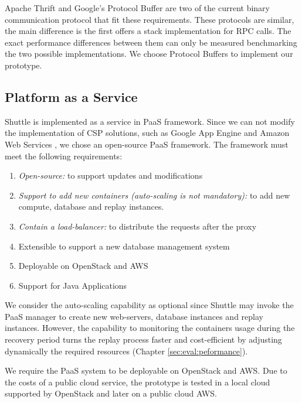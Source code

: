 Apache Thrift \cite{Thrift} and Google's Protocol Buffer \cite{protobuffers} are two of the current binary communication protocol that fit these requirements. These protocols are similar, the main difference is the first offers a stack implementation for \acf{RPC} calls. The exact performance differences between them can only be measured benchmarking the two possible implementations. We choose Protocol Buffers to implement our prototype.



\subsection{Platform as a Service}\label{sec:impl:paas}
Shuttle is implemented as a service in \ac{PaaS} framework. Since we can not modify the implementation of \acf{CSP} solutions, such as Google App Engine \cite{GoogleAppEngine} and Amazon Web Services \cite{AmazonElasticBeanstalk}, we chose an open-source \ac{PaaS} framework. The framework must meet the following requirements: 

\begin{enumerate}
	\item \textit{Open-source:} to support updates and modifications
	\item \textit{Support to add new containers (auto-scaling is not mandatory):} to add new compute, database and replay instances.
	\item \textit{Contain a load-balancer:} to distribute the requests after the proxy
	\item  Extensible to support a new database management system
	\item Deployable on OpenStack and \acf{AWS}
	\item Support for Java Applications
\end{enumerate}

We consider the auto-scaling capability as optional since Shuttle may invoke the \ac{PaaS} manager to create new web-servers, database instances and replay instances. However, the capability to monitoring the containers usage during the recovery period turns the replay process faster and cost-efficient by adjusting dynamically the required resources (Chapter \ref{sec:eval:peformance}). 

We require the \ac{PaaS} system to be deployable on OpenStack \cite{openstack} and \acf{AWS}. Due to the costs of a public cloud service, the prototype is tested in a local cloud supported by OpenStack and later on a public cloud \ac{AWS}.

